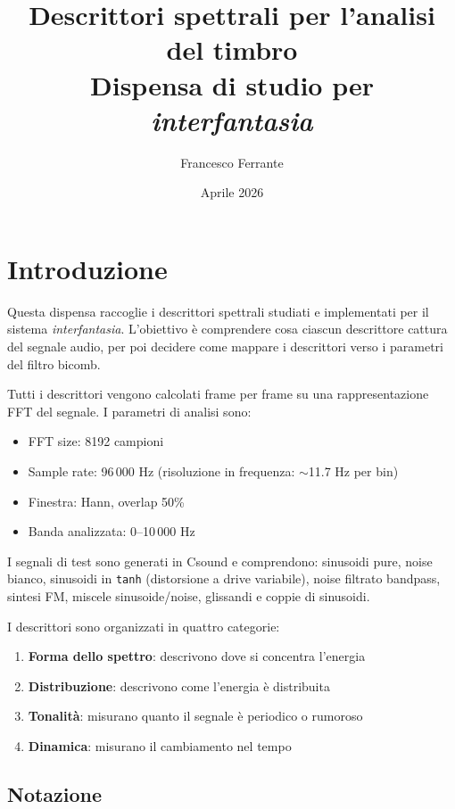 \documentclass[a4paper,11pt]{article}
\title{Descrittori spettrali per l'analisi del timbro\\[0.5em]
\large Dispensa di studio per \emph{interfantasia}}
\author{Francesco Ferrante}
\date{Aprile 2026}
\begin{document}
\maketitle

\tableofcontents
\newpage

\section{Introduzione}

Questa dispensa raccoglie i descrittori spettrali studiati e implementati per
il sistema \emph{interfantasia}. L'obiettivo è comprendere cosa ciascun
descrittore cattura del segnale audio, per poi decidere come mappare i
descrittori verso i parametri del filtro bicomb.

Tutti i descrittori vengono calcolati frame per frame su una
rappresentazione FFT del segnale. I parametri di analisi sono:
\begin{itemize}[nosep]
  \item FFT size: 8192 campioni
  \item Sample rate: 96\,000 Hz (risoluzione in frequenza: $\sim$11.7 Hz per bin)
  \item Finestra: Hann, overlap 50\%
  \item Banda analizzata: 0--10\,000 Hz
\end{itemize}

I segnali di test sono generati in Csound e comprendono: sinusoidi pure,
noise bianco, sinusoidi in \texttt{tanh} (distorsione a drive variabile),
noise filtrato bandpass, sintesi FM, miscele sinusoide/noise, glissandi
e coppie di sinusoidi.

I descrittori sono organizzati in quattro categorie:
\begin{enumerate}[nosep]
  \item \textbf{Forma dello spettro}: descrivono dove si concentra l'energia
  \item \textbf{Distribuzione}: descrivono come l'energia è distribuita
  \item \textbf{Tonalità}: misurano quanto il segnale è periodico o rumoroso
  \item \textbf{Dinamica}: misurano il cambiamento nel tempo
\end{enumerate}

\subsection{Notazione}
\end{document}
